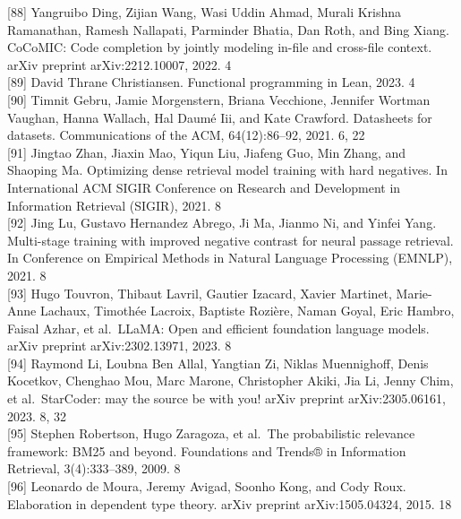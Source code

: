 \documentclass[
]{article}
\begin{document}
{[}88{]} Yangruibo Ding, Zijian Wang, Wasi Uddin Ahmad, Murali Krishna
Ramanathan, Ramesh Nallapati, Parminder Bhatia, Dan Roth, and Bing
Xiang. CoCoMIC: Code completion by jointly modeling in-file and
cross-file context. arXiv preprint arXiv:2212.10007, 2022. 4\\
{[}89{]} David Thrane Christiansen. Functional programming in Lean,
2023. 4\\
{[}90{]} Timnit Gebru, Jamie Morgenstern, Briana Vecchione, Jennifer
Wortman Vaughan, Hanna Wallach, Hal Daumé Iii, and Kate Crawford.
Datasheets for datasets. Communications of the ACM, 64(12):86--92, 2021.
6, 22\\
{[}91{]} Jingtao Zhan, Jiaxin Mao, Yiqun Liu, Jiafeng Guo, Min Zhang,
and Shaoping Ma. Optimizing dense retrieval model training with hard
negatives. In International ACM SIGIR Conference on Research and
Development in Information Retrieval (SIGIR), 2021. 8\\
{[}92{]} Jing Lu, Gustavo Hernandez Abrego, Ji Ma, Jianmo Ni, and Yinfei
Yang. Multi-stage training with improved negative contrast for neural
passage retrieval. In Conference on Empirical Methods in Natural
Language Processing (EMNLP), 2021. 8\\
{[}93{]} Hugo Touvron, Thibaut Lavril, Gautier Izacard, Xavier Martinet,
Marie-Anne Lachaux, Timothée Lacroix, Baptiste Rozière, Naman Goyal,
Eric Hambro, Faisal Azhar, et al.~LLaMA: Open and efficient foundation
language models. arXiv preprint arXiv:2302.13971, 2023. 8\\
{[}94{]} Raymond Li, Loubna Ben Allal, Yangtian Zi, Niklas Muennighoff,
Denis Kocetkov, Chenghao Mou, Marc Marone, Christopher Akiki, Jia Li,
Jenny Chim, et al.~StarCoder: may the source be with you! arXiv preprint
arXiv:2305.06161, 2023. 8, 32\\
{[}95{]} Stephen Robertson, Hugo Zaragoza, et al.~The probabilistic
relevance framework: BM25 and beyond. Foundations and Trends® in
Information Retrieval, 3(4):333--389, 2009. 8\\
{[}96{]} Leonardo de Moura, Jeremy Avigad, Soonho Kong, and Cody Roux.
Elaboration in dependent type theory. arXiv preprint arXiv:1505.04324,
2015. 18
\end{document}
